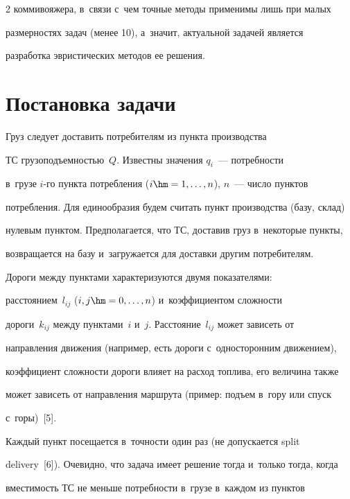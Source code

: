 \begin{multicols}{2}
коммивояжера, в~связи с~чем точные методы применимы лишь при малых


размерностях задач (менее 10), а~значит, актуальной задачей является


разработка эвристических методов ее решения.





\section{Постановка задачи}





  Груз следует доставить потребителям из пункта производства


ТС грузоподъемностью~$Q$. Известны значения $q_i$~--- потребности


в~грузе $i$-го пункта потребления ($i\hm=1, \ldots, n$), $n$~--- число пунктов


потребления. Для единообразия будем считать пункт производства (базу, склад)


нулевым пунктом. Предполагается, что ТС, доставив груз в~некоторые пункты,


возвращается на базу и~загружается для доставки другим потребителям.





  Дороги между пунктами характеризуются двумя показателями:


расстоянием~$l_{ij}$ ($i, j\hm=0, \ldots , n$) и~коэффициен\-том слож\-ности


дороги~$k_{ij}$ между пунктами~$i$ и~$j$. Расстояние~$l_{ij}$ может зависеть от


направления движения (например, есть дороги с~односторонним движением),


коэффициент слож\-ности дороги влияет на расход топлива, его величина также


может зависеть от направления маршрута (пример: подъем в~гору или спуск


с~горы)~[5].





  Каждый пункт посещается в~точности один раз (не допускается split


delivery~[6]). Очевидно, что задача имеет решение тогда и~только тогда, когда


вместимость ТС не меньше потребности в~грузе в~каждом из пунктов



\end{multicols}
